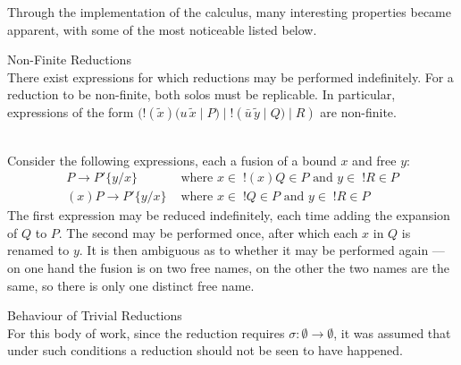         Through the implementation of the calculus, many interesting properties became apparent, with some of the most noticeable listed below.

        \begin{lemma*}{Non-Finite Reductions\\}
            There exist expressions for which reductions may be performed indefinitely.
            For a reduction to be non-finite, both solos must be replicable.
            In particular, expressions of the form $(!(\tilde{x})(u \, \tilde{x} \; | \; P) \; | \; !(\bar{u} \, \tilde{y} \; | \; Q) \; | \; R)$ are non-finite.
        \end{lemma*}

        \begin{example*}{~\\}
            Consider the following expressions, each a fusion of a bound $x$ and free $y$:
            \begin{align*}
                P \rightarrow P'\{y / x\} & \text{ where } x \in \; !(x)Q \in P \text{ and } y \in \; !R \in P \\
                (x)P \rightarrow P'\{y / x\} & \text{ where } x \in \; !Q \in P \text{ and } y \in \; !R \in P
            \end{align*}
            The first expression may be reduced indefinitely, each time adding the expansion of $Q$ to $P$.
            The second may be performed once, after which each $x$ in $Q$ is renamed to $y$.
            It is then ambiguous as to whether it may be performed again --- on one hand the fusion is on two free names, on the other the two names are the same, so there is only one distinct free name.
        \end{example*}

        \begin{remark*}{Behaviour of Trivial Reductions\\}
            For this body of work, since the reduction requires $\sigma : \emptyset \rightarrow \emptyset$, it was assumed that under such conditions a reduction should not be seen to have happened.
        \end{remark*}
